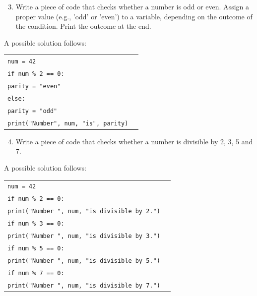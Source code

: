 \documentclass[t,handout,9pt]{beamer}
\begin{document}
\begin{frame}
\vfill
\begin{enumerate}
\setcounter{enumi}{2}
	\item Write a piece of code that checks whether a number is odd or even. Assign a proper value (e.g., 'odd' or 'even') to a variable, depending on the outcome of the condition. Print the outcome at the end.
\end{enumerate}
\vfill
A possible solution follows:
\begin{table}[]
	\begin{tabular}{ll}
	\texttt{num = 42} & \\
	\texttt{if num \% 2 == 0:} & \\
	\texttt{\qquad parity = "even"} & \\
	\texttt{else:} & \\
	\texttt{\qquad parity = "odd"} & \\
	\texttt{print("Number", num, "is", parity)} & \\
	\end{tabular}
	\end{table}
\vfill
\end{frame}
%
\begin{frame}
\vfill
\begin{enumerate}
\setcounter{enumi}{3}
	\item Write a piece of code that checks whether a number is divisible by 2, 3, 5 and 7.
\end{enumerate}
\vfill
A possible solution follows:
\begin{table}[]
	\begin{tabular}{ll}
	\texttt{num = 42} & \\
	\texttt{if num \% 2 == 0:} & \\
	\texttt{\qquad print("Number ", num, "is divisible by 2.")} & \\
	\texttt{if num \% 3 == 0:} & \\
	\texttt{\qquad print("Number ", num, "is divisible by 3.")} & \\
	\texttt{if num \% 5 == 0:} & \\
	\texttt{\qquad print("Number ", num, "is divisible by 5.")} & \\
	\texttt{if num \% 7 == 0:} & \\
	\texttt{\qquad print("Number ", num, "is divisible by 7.")} & \\
	\end{tabular}
	\end{table}
\vfill
\end{frame}
\end{document}

